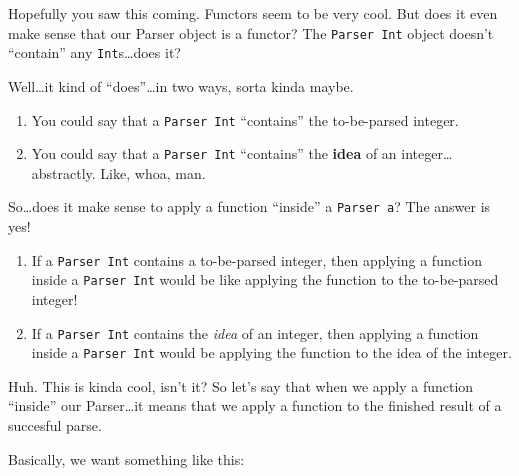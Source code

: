 \documentclass[]{article}
\newenvironment{Shaded}{}{}
\newcommand{\KeywordTok}[1]{\textcolor[rgb]{0.00,0.44,0.13}{\textbf{{#1}}}}
\newcommand{\DataTypeTok}[1]{\textcolor[rgb]{0.56,0.13,0.00}{{#1}}}
\newcommand{\DecValTok}[1]{\textcolor[rgb]{0.25,0.63,0.44}{{#1}}}
\newcommand{\StringTok}[1]{\textcolor[rgb]{0.25,0.44,0.63}{{#1}}}
\newcommand{\OtherTok}[1]{\textcolor[rgb]{0.00,0.44,0.13}{{#1}}}
\newcommand{\FunctionTok}[1]{\textcolor[rgb]{0.02,0.16,0.49}{{#1}}}
\newcommand{\NormalTok}[1]{{#1}}
\begin{document}
Hopefully you saw this coming. Functors seem to be very cool. But does it even
make sense that our Parser object is a functor? The \texttt{Parser\ Int} object
doesn't ``contain'' any \texttt{Int}s\ldots{}does it?

Well\ldots{}it kind of ``does''\ldots{}in two ways, sorta kinda maybe.

\begin{enumerate}
\def\labelenumi{\arabic{enumi}.}
\tightlist
\item
  You could say that a \texttt{Parser\ Int} ``contains'' the to-be-parsed
  integer.
\item
  You could say that a \texttt{Parser\ Int} ``contains'' the \textbf{idea} of an
  integer\ldots{}abstractly. Like, whoa, man.
\end{enumerate}

So\ldots{}does it make sense to apply a function ``inside'' a
\texttt{Parser\ a}? The answer is yes!

\begin{enumerate}
\def\labelenumi{\arabic{enumi}.}
\tightlist
\item
  If a \texttt{Parser\ Int} contains a to-be-parsed integer, then applying a
  function inside a \texttt{Parser\ Int} would be like applying the function to
  the to-be-parsed integer!
\item
  If a \texttt{Parser\ Int} contains the \emph{idea} of an integer, then
  applying a function inside a \texttt{Parser\ Int} would be applying the
  function to the idea of the integer.
\end{enumerate}

Huh. This is kinda cool, isn't it? So let's say that when we apply a function
``inside'' our Parser\ldots{}it means that we apply a function to the finished
result of a succesful parse.

Basically, we want something like this:

\begin{Shaded}
\end{Shaded}
\end{document}
